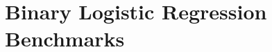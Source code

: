 \documentclass{article}
\begin{document}
\appendix

\section{Binary Logistic Regression Benchmarks}
\label{sec:blogit-benchmarks}

% 



{}
\end{document}
